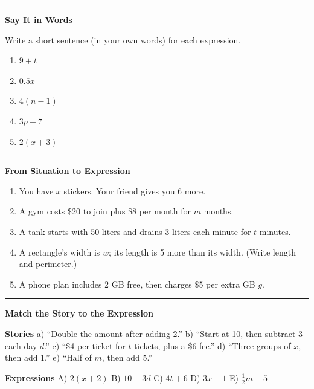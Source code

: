\documentclass[
  letterpaper,
  DIV=11,
  numbers=noendperiod]{scrreprt}
\providecommand{\tightlist}{%
  \setlength{\itemsep}{0pt}\setlength{\parskip}{0pt}}
\begin{document}
\begin{center}\rule{0.5\linewidth}{0.5pt}\end{center}

\textbf{Say It in Words}

Write a short sentence (in your own words) for each expression.

\begin{enumerate}
\def\labelenumi{\arabic{enumi}.}
\setcounter{enumi}{5}
\tightlist
\item
  \(9 + t\)
\item
  \(0.5x\)
\item
  \(4(n - 1)\)
\item
  \(3p + 7\)
\item
  \(2(x+3)\)
\end{enumerate}

\begin{center}\rule{0.5\linewidth}{0.5pt}\end{center}

\textbf{From Situation to Expression}

\begin{enumerate}
\def\labelenumi{\arabic{enumi}.}
\setcounter{enumi}{10}
\tightlist
\item
  You have \(x\) stickers. Your friend gives you 6 more.
\item
  A gym costs \$20 to join plus \$8 per month for \(m\) months.
\item
  A tank starts with 50 liters and drains 3 liters each minute for \(t\)
  minutes.
\item
  A rectangle's width is \(w\); its length is 5 more than its width.
  (Write length and perimeter.)
\item
  A phone plan includes 2 GB free, then charges \$5 per extra GB \(g\).
\end{enumerate}

\begin{center}\rule{0.5\linewidth}{0.5pt}\end{center}

\textbf{Match the Story to the Expression}

\textbf{Stories} a) ``Double the amount after adding 2.'' b) ``Start at
10, then subtract 3 each day \(d\).'' c) ``\$4 per ticket for \(t\)
tickets, plus a \$6 fee.'' d) ``Three groups of \(x\), then add 1.'' e)
``Half of \(m\), then add 5.''

\textbf{Expressions} A) \(2(x+2)\) B) \(10-3d\) C) \(4t+6\) D) \(3x+1\)
E) \(\tfrac12 m+5\)
\end{document}
